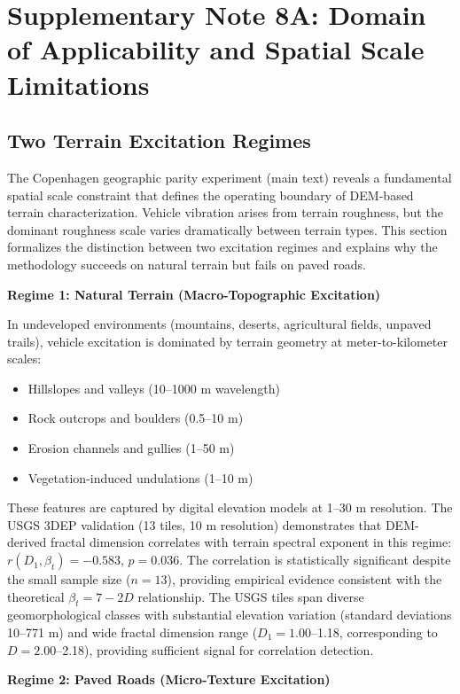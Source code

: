 \documentclass[11pt]{article}
\begin{document}
\section{Supplementary Note 8A: Domain of Applicability and Spatial Scale Limitations}

\subsection{Two Terrain Excitation Regimes}

The Copenhagen geographic parity experiment (main text) reveals a fundamental spatial scale constraint that defines the operating boundary of DEM-based terrain characterization. Vehicle vibration arises from terrain roughness, but the dominant roughness scale varies dramatically between terrain types. This section formalizes the distinction between two excitation regimes and explains why the methodology succeeds on natural terrain but fails on paved roads.

\textbf{Regime 1: Natural Terrain (Macro-Topographic Excitation)}

In undeveloped environments (mountains, deserts, agricultural fields, unpaved trails), vehicle excitation is dominated by terrain geometry at meter-to-kilometer scales:
\begin{itemize}
\item Hillslopes and valleys (10--1000 m wavelength)
\item Rock outcrops and boulders (0.5--10 m)
\item Erosion channels and gullies (1--50 m)
\item Vegetation-induced undulations (1--10 m)
\end{itemize}

These features are captured by digital elevation models at 1--30 m resolution. The USGS 3DEP validation (13 tiles, 10 m resolution) demonstrates that DEM-derived fractal dimension correlates with terrain spectral exponent in this regime: $r(D_1, \beta_t) = -0.583$, $p = 0.036$. The correlation is statistically significant despite the small sample size ($n=13$), providing empirical evidence consistent with the theoretical $\beta_t = 7-2D$ relationship. The USGS tiles span diverse geomorphological classes with substantial elevation variation (standard deviations 10--771 m) and wide fractal dimension range ($D_1 = 1.00$--1.18, corresponding to $D = 2.00$--2.18), providing sufficient signal for correlation detection.

\textbf{Regime 2: Paved Roads (Micro-Texture Excitation)}
\end{document}
